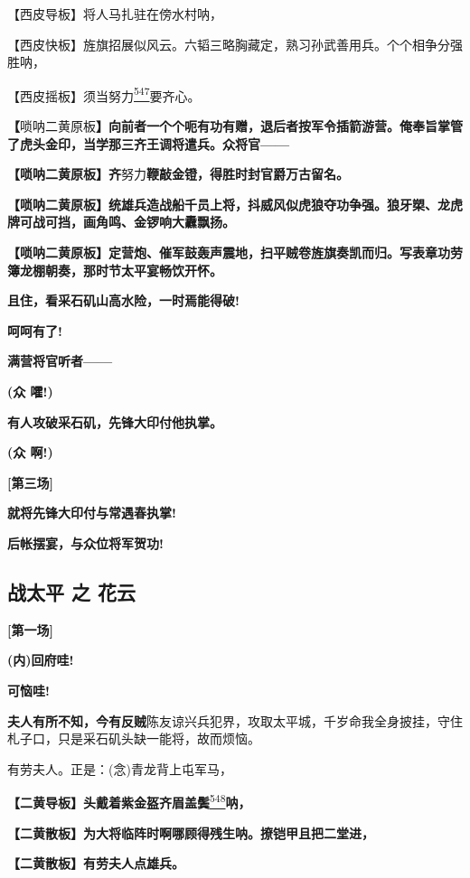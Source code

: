 【西皮导板】将人马扎驻在傍水村呐，

【西皮快板】旌旗招展似风云。六韬三略胸藏定，熟习孙武善用兵。个个相争分强胜呐，

【西皮摇板】须当努力\protect\hyperlink{fn547}{\textsuperscript{547}}要齐心。

\textbf{【}唢呐二黄原板\textbf{】向前者一个个呃有功有赠，退后者按军令插箭游营。俺奉旨掌管了虎头金印，当学那三齐王调将遣兵。众将官------}

\textbf{【唢呐二黄原板】齐}努力\textbf{鞭敲金镫，得胜时封官爵万古留名。}

\textbf{【唢呐二黄原板】统雄兵造战船千员上将，抖威风似虎狼夺功争强。狼牙槊、龙虎牌可战可挡，画角鸣、金锣响大纛飘扬。}

\textbf{【唢呐二黄原板】定营炮、催军鼓轰声震地，扫平贼卷旌旗奏凯而归。写表章功劳簿龙棚朝奏，那时节太平宴畅饮开怀。}

\textbf{且住，看采石矶山高水险，一时焉能得破!}

\textbf{呵呵有了!}

\textbf{满营将官听者------}

\textbf{(众 嚯!)}

\textbf{有人攻破采石矶，先锋大印付他执掌。}

\textbf{(众 啊!)}

\textbf{{[}第三场{]}}

\textbf{就将先锋大印付与常遇春执掌!}

\textbf{后帐摆宴，与众位将军贺功!}

\newpage
\hypertarget{ux6218ux592aux5e73-ux4e4b-ux82b1ux4e91}{%
\subsection{战太平 之
花云}\label{ux6218ux592aux5e73-ux4e4b-ux82b1ux4e91}}

\textbf{{[}第一场{]}}

\textbf{(内)回府哇!}

\textbf{可恼哇!}

\textbf{夫人有所不知，今有反贼}陈友谅兴兵犯界，攻取太平城，千岁命我全身披挂，守住札子口，只是采石矶头缺一能将，故而烦恼。

有劳夫人。正是：(念)青龙背上屯军马，

\textbf{【二黄导板】头戴着紫金盔齐眉盖鬓}\protect\hyperlink{fn548}{\textsuperscript{548}}\textbf{呐，}

\textbf{【二黄散板】为大将临阵时啊哪顾得残生呐。撩铠甲且把二堂进，}

\textbf{【二黄散板】有劳夫人点雄兵。}

